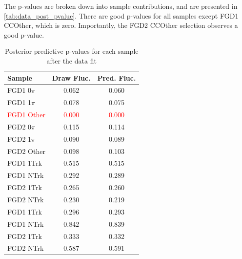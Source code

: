The p-values are broken down into sample contributions, and are presented in \autoref{tab:data_post_pvalue}. There are good p-values for all samples except FGD1 CCOther, which is zero. Importantly, the FGD2 CCOther selection observes a good p-value.
\begin{table}[h]
	\centering
\begin{tabular}{l | c c }
	\hline \hline
	Sample & Draw Fluc. & Pred. Fluc. \\
	\hline
	FGD1 0$\pi$ & 0.062 & 0.060 \\
	FGD1 1$\pi$ & 0.078 & 0.075 \\
	\textcolor{red}{FGD1 Other}  & \textcolor{red}{0.000} & \textcolor{red}{0.000} \\
	FGD2 0$\pi$ & 0.115 & 0.114 \\
	FGD2 1$\pi$ & 0.090 & 0.089 \\
	FGD2 Other  & 0.098 & 0.103 \\
	\hline
	FGD1 1Trk & 0.515 & 0.515 \\
	FGD1 NTrk & 0.292 & 0.289 \\
	FGD2 1Trk & 0.265 & 0.260 \\
	FGD2 NTrk & 0.230 & 0.219 \\
	\hline
	FGD1 \numu 1Trk & 0.296 & 0.293 \\
	FGD1 \numu NTrk & 0.842 & 0.839 \\
	FGD2 \numu 1Trk & 0.333 & 0.332 \\
	FGD2 \numu NTrk & 0.587 & 0.591 \\
	\hline
	\hline
\end{tabular}
\caption{Posterior predictive p-values for each sample after the data fit}
\label{tab:data_post_pvalue}
\end{table}


